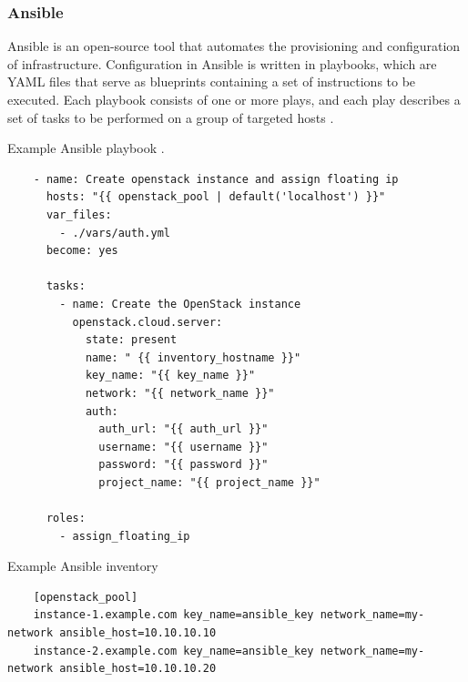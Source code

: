 
\subsubsection{Ansible}
\label{sec:ansible}

Ansible is an open-source tool that automates the provisioning and configuration of infrastructure. Configuration in Ansible is written in playbooks, which are YAML files that serve as blueprints containing a set of instructions to be executed. Each playbook consists of one or more plays, and each play describes a set of tasks to be performed on a group of targeted hosts \cite{Ansible} \cite{AnsiblePlaybook}.

\begin{listing}[htb]
    \centering
    \caption{Example Ansible playbook \cite{AnsibleOpenstack}.}
    \begin{verbatim}
    - name: Create openstack instance and assign floating ip
      hosts: "{{ openstack_pool | default('localhost') }}"
      var_files:
        - ./vars/auth.yml
      become: yes
  
      tasks:
        - name: Create the OpenStack instance
          openstack.cloud.server:
            state: present
            name: " {{ inventory_hostname }}"
            key_name: "{{ key_name }}"
            network: "{{ network_name }}"
            auth:
              auth_url: "{{ auth_url }}"
              username: "{{ username }}"
              password: "{{ password }}"
              project_name: "{{ project_name }}"
  
      roles:
        - assign_floating_ip

    \end{verbatim}
    \label{lst:exampleAnsiblePlaybook}
\end{listing}

\begin{listing}[htb]
    \centering
    \caption{Example Ansible inventory \cite{AnsibleInventory} \cite{AnsibleOpenstack} \cite{AnsibleVars}}
    \begin{verbatim}
    [openstack_pool]
    instance-1.example.com key_name=ansible_key network_name=my-network ansible_host=10.10.10.10
    instance-2.example.com key_name=ansible_key network_name=my-network ansible_host=10.10.10.20
    \end{verbatim}
    \label{lst:exampleAnsibleInventory}
\end{listing}


